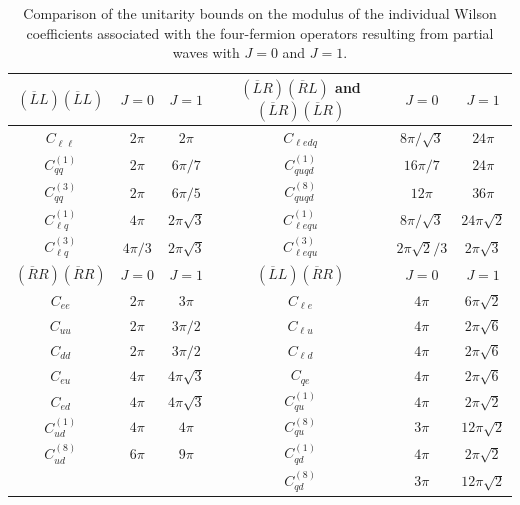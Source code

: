 \documentclass[a4paper,11pt]{article}
\begin{document}
\begin{table}[h!tb]
\renewcommand{\arraystretch}{1.5}
\centering
\begin{tabular}{c|cc||c|cc}
\toprule
\rowcolor{hdrcolor}\boldmath$(\overline L L)(\overline L L)$ & \boldmath$J=0$ & \boldmath$J=1$
& {\boldmath$(\overline{L}R)(\overline{R}L)$} and {\boldmath$(\overline{L}R)(\overline{L}R)$} & \boldmath$J=0$ & \boldmath$J=1$ \\
\hline
$C_{\ell\ell}$ & $2\pi$ & $2\pi$ 
& $C_{\ell e d q}$ & $8\pi/\sqrt{3}$ & $24\pi$ \\

$C_{qq}^{(1)}$ & $2\pi$ & $6\pi/7$ 
& $C_{quqd}^{(1)}$ & $16\pi/7$ & $24\pi$ \\

$C_{qq}^{(3)}$ & $2\pi$ & $6\pi/5$ 
& $C_{quqd}^{(8)}$ & $12\pi$ & $36\pi$ \\

$C_{\ell q}^{(1)}$ & $4\pi$ & $2\pi\sqrt{3}$ 
& $C_{\ell equ}^{(1)}$ & $8\pi/\sqrt{3}$ & $24\pi\sqrt{2}$ \\

$C_{\ell q}^{(3)}$ & $4\pi/3$ & $2\pi\sqrt{3}$ 
& $C_{\ell e qu}^{(3)}$ & $2\pi\sqrt{2}/3$ & $2\pi\sqrt{3}$ \\
\midrule
\rowcolor{hdrcolor}\boldmath$(\overline RR)(\overline RR)$ & \boldmath$J=0$ & \boldmath$J=1$
& \boldmath$(\overline L L)(\overline R R)$ &\boldmath$J=0$ & \boldmath$J=1$ \\
\hline
$C_{ee}$ & $2\pi$ & $3\pi$ 
& $C_{\ell e}$ & $4\pi$ & $6\pi\sqrt{2}$ \\

$C_{uu}$ & $2\pi$ & $3\pi/2$ 
& $C_{\ell u}$ & $4\pi$ & $2\pi\sqrt{6}$ \\

$C_{dd}$ & $2\pi$ & $3\pi/2$ 
& $C_{\ell d}$ & $4\pi$ & $2\pi\sqrt{6}$ \\

$C_{eu}$ & $4\pi$ & $4\pi\sqrt{3}$ 
& $C_{qe}$ & $4\pi$ & $2\pi\sqrt{6}$ \\

$C_{ed}$ & $4\pi$ & $4\pi\sqrt{3}$ 
& $C_{qu}^{(1)}$ & $4\pi$ & $2\pi\sqrt{2}$ \\

$C_{ud}^{(1)}$ & $4\pi$ & $4\pi$ 
& $C_{qu}^{(8)}$ & $3\pi$ & $12\pi\sqrt{2}$ \\

$C_{ud}^{(8)}$ & $6\pi$ & $9\pi$ 
& $C_{qd}^{(1)}$ & $4\pi$ & $2\pi\sqrt{2}$ \\
&& & $C_{qd}^{(8)}$ & $3\pi$ & $12\pi\sqrt{2}$ \\
\bottomrule
\end{tabular}
\caption{Comparison of the unitarity bounds on the modulus of the individual Wilson coefficients associated with the four-fermion operators resulting from partial waves with $J=0$ and $J=1$.}
\label{tab: UB for psi^4}
\end{table}
\end{document}
